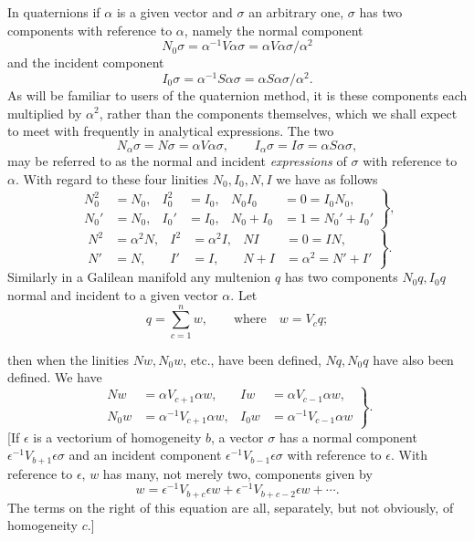 \documentclass[11pt]{article}
\begin{document}
\indent In quaternions if $\alpha$ is a given vector and $\sigma$ an arbitrary one, $\sigma$ has two components with reference to $\alpha$, namely the normal component
\[
N_0\sigma=\alpha^{-1}V\alpha\sigma=\alpha V\alpha\sigma/\alpha^2
\]
and the incident component
\[
I_0\sigma=\alpha^{-1}S\alpha\sigma=\alpha S\alpha\sigma/\alpha^2.
\]
As will be familiar to users of the quaternion method, it is these components each multiplied by $\alpha^2$, rather than the components themselves, which we shall expect to meet with frequently in analytical expressions. The two
\[
N_\alpha\sigma=N\sigma=\alpha V\alpha\sigma,\qquad I_\alpha\sigma=I\sigma=\alpha S\alpha\sigma,
\]
may be referred to as the normal and incident \emph{expressions} of $\sigma$ with reference to $\alpha$. With regard to these four linities $N_0,I_0,N,I$ we have as follows
\begin{equation}\left.\begin{aligned}N_0^2&=N_0,&I_0^2&=I_0,&N_0I_0&=0=I_0N_0,\\N_0'&=N_0,&I_0'&=I_0,&N_0+I_0&=1=N_0'+I_0'\end{aligned}\right\},\tag{1}\end{equation}
\begin{equation}\left.\begin{aligned}N^2&=\alpha^2N,&I^2&=\alpha^2I,&NI&=0=IN,\\N'&=N,&I'&=I,&N+I&=\alpha^2=N'+I'\end{aligned}\right\}.\tag{2}\end{equation}
Similarly in a Galilean manifold any multenion $q$ has two components $N_0q,I_0q$ normal and incident to a given vector $\alpha$. Let
\[
q=\sum_{c=1}^n w,\qquad\text{where}\quad w=V_cq;
\]

then when the linities $Nw,N_0w$, etc., have been defined, $Nq,N_0q$ have also been defined. We have
\begin{equation}\left.\begin{aligned}Nw&=\alpha V_{c+1}\alpha w,&Iw&=\alpha V_{c-1}\alpha w,\\N_0w&=\alpha^{-1}V_{c+1}\alpha w,&I_0w&=\alpha^{-1}V_{c-1}\alpha w\end{aligned}\right\}.\tag{3}\end{equation}
[If $\epsilon$ is a vectorium of homogeneity $b$, a vector $\sigma$ has a normal component $\epsilon^{-1}V_{b+1}\epsilon\sigma$ and an incident component $\epsilon^{-1}V_{b-1}\epsilon\sigma$ with reference to $\epsilon$. With reference to $\epsilon$, $w$ has many, not merely two, components given by
\[
w=\epsilon^{-1}V_{b+c}\epsilon w+\epsilon^{-1}V_{b+c-2}\epsilon w+\cdots.
\]
The terms on the right of this equation are all, separately, but not obviously, of homogeneity $c$.]
\end{document}
